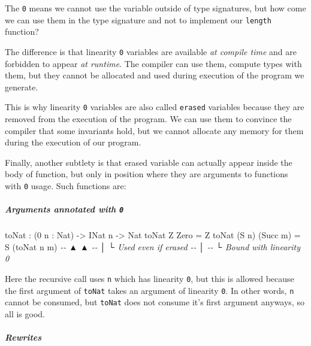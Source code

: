 \documentclass[
]{article}
\newenvironment{Shaded}{}{}
\newcommand{\CommentTok}[1]{\textcolor[rgb]{0.38,0.63,0.69}{\textit{#1}}}
\newcommand{\DataTypeTok}[1]{\textcolor[rgb]{0.56,0.13,0.00}{#1}}
\newcommand{\DecValTok}[1]{\textcolor[rgb]{0.25,0.63,0.44}{#1}}
\newcommand{\NormalTok}[1]{#1}
\newcommand{\OperatorTok}[1]{\textcolor[rgb]{0.40,0.40,0.40}{#1}}
\newcommand{\OtherTok}[1]{\textcolor[rgb]{0.00,0.44,0.13}{#1}}
\begin{document}
The \texttt{0} means we cannot use the variable outside of type
signatures, but how come we can use them in the type signature and not
to implement our \texttt{length} function?

The difference is that linearity \texttt{0} variables are available
\emph{at compile time} and are forbidden to appear \emph{at runtime}.
The compiler can use them, compute types with them, but they cannot be
allocated and used during execution of the program we generate.

This is why linearity \texttt{0} variables are also called
\texttt{erased} variables because they are removed from the execution of
the program. We can use them to convince the compiler that some
invariants hold, but we cannot allocate any memory for them during the
execution of our program.

Finally, another subtlety is that erased variable can actually appear
inside the body of function, but only in position where they are
arguments to functions with \texttt{0} usage. Such functions are:

\hypertarget{arguments-annotated-with-0}{%
\subparagraph{\texorpdfstring{Arguments annotated with
\texttt{0}}{Arguments annotated with 0}}\label{arguments-annotated-with-0}}

\begin{Shaded}
\begin{Highlighting}[]
\NormalTok{toNat }\OperatorTok{:}\NormalTok{ (}\DecValTok{0}\NormalTok{ n }\OperatorTok{:} \DataTypeTok{Nat}\NormalTok{) }\OtherTok{{-}\textgreater{}} \DataTypeTok{INat}\NormalTok{ n }\OtherTok{{-}\textgreater{}} \DataTypeTok{Nat}
\NormalTok{toNat }\DataTypeTok{Z} \DataTypeTok{Zero} \OtherTok{=} \DataTypeTok{Z}
\NormalTok{toNat (}\DataTypeTok{S}\NormalTok{ n) (}\DataTypeTok{Succ}\NormalTok{ m) }\OtherTok{=} \DataTypeTok{S}\NormalTok{ (toNat n m)}
\CommentTok{{-}{-}       ▲                      ▲}
\CommentTok{{-}{-}       │                      └ Used even if erased}
\CommentTok{{-}{-}       │}
\CommentTok{{-}{-}       └ Bound with linearity 0}
\end{Highlighting}
\end{Shaded}

Here the recursive call uses \texttt{n} which has linearity \texttt{0},
but this is allowed because the first argument of \texttt{toNat} takes
an argument of linearity \texttt{0}. In other words, \texttt{n} cannot
be consumed, but \texttt{toNat} does not consume it's first argument
anyways, so all is good.

\hypertarget{rewrites}{%
\subparagraph{Rewrites}\label{rewrites}}
\end{document}
